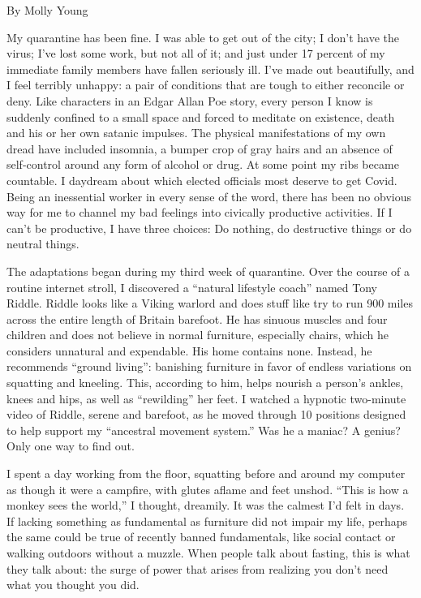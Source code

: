 By Molly Young

My quarantine has been fine. I was able to get out of the city; I don't
have the virus; I've lost some work, but not all of it; and just under
17 percent of my immediate family members have fallen seriously ill.
I've made out beautifully, and I feel terribly unhappy: a pair of
conditions that are tough to either reconcile or deny. Like characters
in an Edgar Allan Poe story, every person I know is suddenly confined to
a small space and forced to meditate on existence, death and his or her
own satanic impulses. The physical manifestations of my own dread have
included insomnia, a bumper crop of gray hairs and an absence of
self-control around any form of alcohol or drug. At some point my ribs
became countable. I daydream about which elected officials most deserve
to get Covid. Being an inessential worker in every sense of the word,
there has been no obvious way for me to channel my bad feelings into
civically productive activities. If I can't be productive, I have three
choices: Do nothing, do destructive things or do neutral things.

The adaptations began during my third week of quarantine. Over the
course of a routine internet stroll, I discovered a ``natural lifestyle
coach'' named Tony Riddle. Riddle looks like a Viking warlord and does
stuff like try to run 900 miles across the entire length of Britain
barefoot. He has sinuous muscles and four children and does not believe
in normal furniture, especially chairs, which he considers unnatural and
expendable. His home contains none. Instead, he recommends ``ground
living'': banishing furniture in favor of endless variations on
squatting and kneeling. This, according to him, helps nourish a person's
ankles, knees and hips, as well as ``rewilding'' her feet. I watched a
hypnotic two-minute video of Riddle, serene and barefoot, as he moved
through 10 positions designed to help support my ``ancestral movement
system.'' Was he a maniac? A genius? Only one way to find out.

I spent a day working from the floor, squatting before and around my
computer as though it were a campfire, with glutes aflame and feet
unshod. ``This is how a monkey sees the world,'' I thought, dreamily. It
was the calmest I'd felt in days. If lacking something as fundamental as
furniture did not impair my life, perhaps the same could be true of
recently banned fundamentals, like social contact or walking outdoors
without a muzzle. When people talk about fasting, this is what they talk
about: the surge of power that arises from realizing you don't need what
you thought you did.

